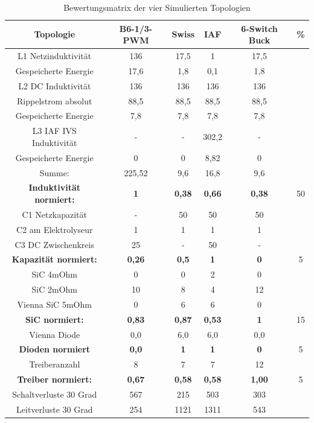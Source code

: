 \begin{table}
	\caption{Bewertungsmatrix der vier Simulierten Topologien}
\begin{tabular}{|c|c|c|c|c|c|}
	\hline
	Topologie & B6-1/3-PWM & Swiss & IAF & 6-Switch Buck & \% \\
	\hline
	L1 Netzinduktivität & 136 & 17,5 & 1 & 17,5 &\\
	\hline
	Gespeicherte Energie & 17,6 & 1,8 & 0,1 & 1,8 &\\
	\hline
	L2 DC Induktivität  & 136 & 136 & 136 & 136 &\\
	\hline
	Rippelstrom absolut & 88,5 & 88,5 & 88,5 & 88,5& \\
	\hline
	Gespeicherte Energie & 7,8 & 7,8 & 7,8 & 7,8 &\\
	\hline
	L3 IAF IVS Induktivität & - & - & 302,2 & - &\\
	\hline
	Gespeicherte Energie  & 0 & 0 & 8,82 & 0 &\\
	\hline
	Summe: & 225,52 & 9,6 & 16,8 & 9,6 &\\
	\hline
	\bfseries Induktivität normiert: & \bfseries 1 &\bfseries 0,38 &\bfseries 0,66 &\bfseries 0,38 & 50\\
	\hline
	C1 Netzkapazität & - & 50 & 50 & 50& \\
	\hline
	C2 am Elektrolyseur & 1 & 1 & 1 & 1 &\\
	\hline
	C3 DC Zwischenkreis & 25 & - & 50 & - &\\
	\hline
	\bfseries Kapazität normiert: &\bfseries 0,26 &\bfseries 0,5 &\bfseries 1 &\bfseries 0 &5\\
	\hline
	SiC 4mOhm & 0 & 0 & 2 & 0 &\\
	\hline
	SiC 2mOhm & 10 & 8 & 4 & 12 &\\
	\hline
	Vienna SiC 5mOhm & 0 & 6 & 6 & 0 &\\
	\hline
	\bfseries SiC normiert: &\bfseries 0,83 &\bfseries 0,87 &\bfseries 0,53 &\bfseries 1 &15\\
	\hline
	Vienna Diode & 0,0 & 6,0 & 6,0 & 0,0& \\
	\hline
	\bfseries Dioden normiert &\bfseries 0,0 & \bfseries1 &\bfseries 1 &\bfseries 0&5 \\
	\hline
	Treiberanzahl & 8 & 7 & 7 & 12 &\\
	\hline
	\bfseries Treiber normiert: &\bfseries 0,67 &\bfseries 0,58 &\bfseries 0,58 &\bfseries 1,00& 5\\
	\hline
	Schaltverluste 30 Grad & 567 & 215 & 503 & 303 &\\
	\hline
	Leitverluste 30 Grad & 254 & 1121 & 1311 & 543 &\\

\end{tabular}
\end{table}
